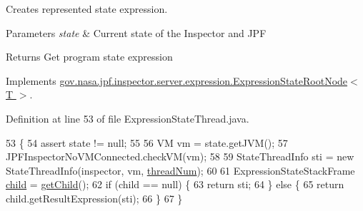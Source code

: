 Creates represented state expression. 


\begin{DoxyParams}{Parameters}
{\em state} & Current state of the Inspector and J\+PF \\
\hline
\end{DoxyParams}
\begin{DoxyReturn}{Returns}
Get program state expression 
\end{DoxyReturn}


Implements \hyperlink{interfacegov_1_1nasa_1_1jpf_1_1inspector_1_1server_1_1expression_1_1_expression_state_root_node_ab4b2088b28e070af5102f32a85721c6c}{gov.\+nasa.\+jpf.\+inspector.\+server.\+expression.\+Expression\+State\+Root\+Node$<$ T $>$}.



Definition at line 53 of file Expression\+State\+Thread.\+java.


\begin{DoxyCode}
53                                                                                                            
                       \{
54     assert state != null;
55 
56     VM vm = state.getJVM();
57     JPFInspectorNoVMConnected.checkVM(vm);
58 
59     StateThreadInfo sti = \textcolor{keyword}{new} StateThreadInfo(inspector, vm, \hyperlink{classgov_1_1nasa_1_1jpf_1_1inspector_1_1server_1_1expression_1_1expressions_1_1_expression_state_thread_a4db41aca6ee66ae2da3753785bed3167}{threadNum});
60 
61     ExpressionStateStackFrame \hyperlink{classgov_1_1nasa_1_1jpf_1_1inspector_1_1server_1_1expression_1_1_expression_state_unary_operator_a66041b1f569a361549e28a00f7ca5f2f}{child} = \hyperlink{classgov_1_1nasa_1_1jpf_1_1inspector_1_1server_1_1expression_1_1_expression_state_unary_operator_a150bac338d6557f79ca185d3f6ad6e06}{getChild}();
62     \textcolor{keywordflow}{if} (child == null) \{
63       \textcolor{keywordflow}{return} sti;
64     \} \textcolor{keywordflow}{else} \{
65       \textcolor{keywordflow}{return} child.getResultExpression(sti);
66     \}
67   \}
\end{DoxyCode}
